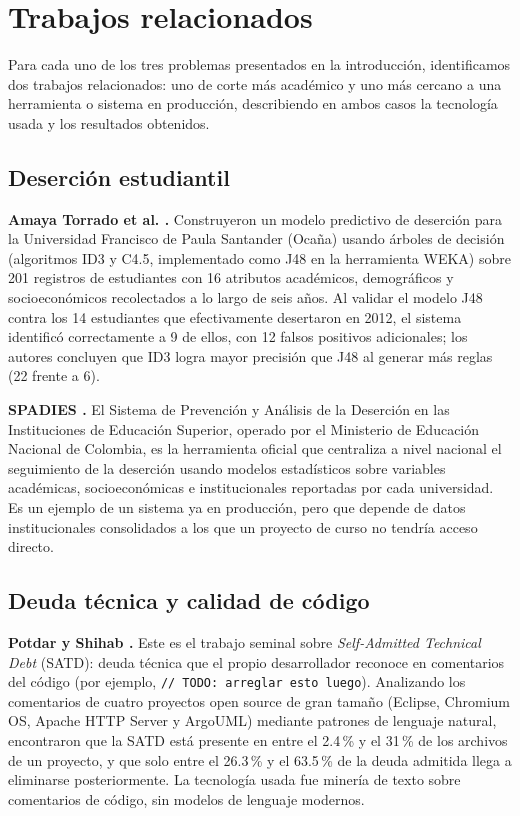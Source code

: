 \section{Trabajos relacionados}
\label{sec:trabajos-relacionados}

Para cada uno de los tres problemas presentados en la introducción, identificamos dos trabajos relacionados: uno de corte más académico y uno más cercano a una herramienta o sistema en producción, describiendo en ambos casos la tecnología usada y los resultados obtenidos.

\subsection{Deserción estudiantil}

\textbf{Amaya Torrado et al. \parencite{AmayaTorrado2014}.} Construyeron un modelo predictivo de deserción para la Universidad Francisco de Paula Santander (Ocaña) usando árboles de decisión (algoritmos ID3 y C4.5, implementado como J48 en la herramienta WEKA) sobre 201 registros de estudiantes con 16 atributos académicos, demográficos y socioeconómicos recolectados a lo largo de seis años. Al validar el modelo J48 contra los 14 estudiantes que efectivamente desertaron en 2012, el sistema identificó correctamente a 9 de ellos, con 12 falsos positivos adicionales; los autores concluyen que ID3 logra mayor precisión que J48 al generar más reglas (22 frente a 6).

\textbf{SPADIES \parencite{SPADIES2024}.} El Sistema de Prevención y Análisis de la Deserción en las Instituciones de Educación Superior, operado por el Ministerio de Educación Nacional de Colombia, es la herramienta oficial que centraliza a nivel nacional el seguimiento de la deserción usando modelos estadísticos sobre variables académicas, socioeconómicas e institucionales reportadas por cada universidad. Es un ejemplo de un sistema ya en producción, pero que depende de datos institucionales consolidados a los que un proyecto de curso no tendría acceso directo.

\subsection{Deuda técnica y calidad de código}

\textbf{Potdar y Shihab \parencite{PotdarShihab2014}.} Este es el trabajo seminal sobre \textit{Self-Admitted Technical Debt} (SATD): deuda técnica que el propio desarrollador reconoce en comentarios del código (por ejemplo, \texttt{// TODO: arreglar esto luego}). Analizando los comentarios de cuatro proyectos open source de gran tamaño (Eclipse, Chromium OS, Apache HTTP Server y ArgoUML) mediante patrones de lenguaje natural, encontraron que la SATD está presente en entre el 2.4\,\% y el 31\,\% de los archivos de un proyecto, y que solo entre el 26.3\,\% y el 63.5\,\% de la deuda admitida llega a eliminarse posteriormente. La tecnología usada fue minería de texto sobre comentarios de código, sin modelos de lenguaje modernos.

